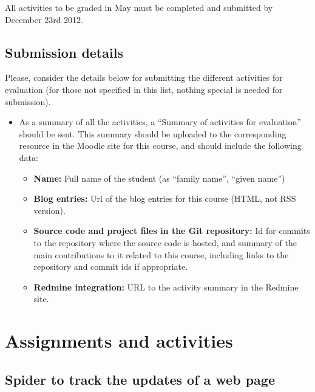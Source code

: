 \documentclass[a4paper]{article}
\begin{document}
All activities to be graded in May must be completed and submitted by December 23rd 2012.

\subsection{Submission details}

Please, consider the details below for submitting the different activities for evaluation (for those not specified in this list, nothing special is needed for submission).

\begin{itemize}
\item As a summary of all the activities, a ``Summary of activities
  for evaluation'' should be sent. This summary should be uploaded to
  the corresponding resource in the Moodle site for this course, and
  should include the following data: 
  \begin{itemize}
  \item \textbf{Name:} Full name of the student (as ``family name'', ``given name'')
  \item \textbf{Blog entries:} Url of the blog entries for this course (HTML, not RSS version).
  \item \textbf{Source code and project files in the Git repository:} Id for commits
    to the repository where the source code is hosted, and summary of
    the main contributions to it related to this course, including
    links to the repository and commit ids if appropriate. 
  \item \textbf{Redmine integration:} URL to the activity summary in
    the Redmine site.   
  \end{itemize}
\end{itemize}

\section{Assignments and activities}

\subsection{Spider to track the updates of a web page}
\label{sub:python}
\end{document}
